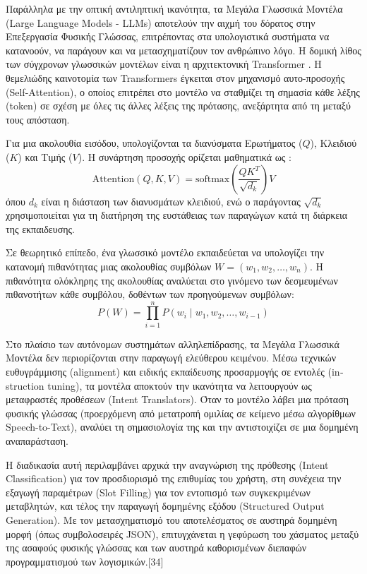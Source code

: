 \documentclass[twoside, a4paper, 11pt]{article}
\newcommand{\textlatin}[1]{\textenglish{#1}}
\begin{document}
Παράλληλα με την οπτική αντιληπτική ικανότητα, τα Μεγάλα Γλωσσικά Μοντέλα (\textlatin{Large Language Models - LLMs}) αποτελούν την αιχμή του δόρατος στην Επεξεργασία Φυσικής Γλώσσας, επιτρέποντας στα υπολογιστικά συστήματα να κατανοούν, να παράγουν και να μετασχηματίζουν τον ανθρώπινο λόγο. Η δομική λίθος των σύγχρονων γλωσσικών μοντέλων είναι η αρχιτεκτονική \textlatin{Transformer} \cite{vaswani2017attention}. Η θεμελιώδης καινοτομία των \textlatin{Transformers} έγκειται στον μηχανισμό αυτο-προσοχής (\textlatin{Self-Attention}), ο οποίος επιτρέπει στο μοντέλο να σταθμίζει τη σημασία κάθε λέξης (\textlatin{token}) σε σχέση με όλες τις άλλες λέξεις της πρότασης, ανεξάρτητα από τη μεταξύ τους απόσταση.

Για μια ακολουθία εισόδου, υπολογίζονται τα διανύσματα Ερωτήματος ($Q$), Κλειδιού ($K$) και Τιμής ($V$). Η συνάρτηση προσοχής ορίζεται μαθηματικά ως \cite{vaswani2017attention}:
\begin{equation}
\text{Attention}(Q, K, V) = \text{softmax}\left(\frac{QK^T}{\sqrt{d_k}}\right)V
\end{equation}
όπου $d_k$ είναι η διάσταση των διανυσμάτων κλειδιού, ενώ ο παράγοντας $\sqrt{d_k}$ χρησιμοποιείται για τη διατήρηση της ευστάθειας των παραγώγων κατά τη διάρκεια της εκπαιδευσης.

Σε θεωρητικό επίπεδο, ένα γλωσσικό μοντέλο εκπαιδεύεται να υπολογίζει την κατανομή πιθανότητας μιας ακολουθίας συμβόλων $W = (w_1, w_2, \dots, w_n)$. Η πιθανότητα ολόκληρης της ακολουθίας αναλύεται στο γινόμενο των δεσμευμένων πιθανοτήτων κάθε συμβόλου, δοθέντων των προηγούμενων συμβόλων:
\begin{equation}
P(W) = \prod_{i=1}^{n} P(w_i \mid w_1, w_2, \dots, w_{i-1})
\end{equation}

Στο πλαίσιο των αυτόνομων συστημάτων αλληλεπίδρασης, τα Μεγάλα Γλωσσικά Μοντέλα δεν περιορίζονται στην παραγωγή ελεύθερου κειμένου. Μέσω τεχνικών ευθυγράμμισης (\textlatin{alignment}) και ειδικής εκπαίδευσης προσαρμογής σε εντολές (\textlatin{instruction tuning}), τα μοντέλα αποκτούν την ικανότητα να λειτουργούν ως μεταφραστές προθέσεων (\textlatin{Intent Translators}). Όταν το μοντέλο λάβει μια πρόταση φυσικής γλώσσας (προερχόμενη από μετατροπή ομιλίας σε κείμενο μέσω αλγορίθμων \textlatin{Speech-to-Text}), αναλύει τη σημασιολογία της και την αντιστοιχίζει σε μια δομημένη αναπαράσταση.

Η διαδικασία αυτή περιλαμβάνει αρχικά την αναγνώριση της πρόθεσης (\textlatin{Intent Classification}) για τον προσδιορισμό της επιθυμίας του χρήστη, στη συνέχεια την εξαγωγή παραμέτρων (\textlatin{Slot Filling}) για τον εντοπισμό των συγκεκριμένων μεταβλητών, και τέλος την παραγωγή δομημένης εξόδου (\textlatin{Structured Output Generation}). Με τον μετασχηματισμό του αποτελέσματος σε αυστηρά δομημένη μορφή (όπως συμβολοσειρές \textlatin{JSON}), επιτυγχάνεται η γεφύρωση του χάσματος μεταξύ της ασαφούς φυσικής γλώσσας και των αυστηρά καθορισμένων διεπαφών προγραμματισμού των λογισμικών.[34]
\end{document}
